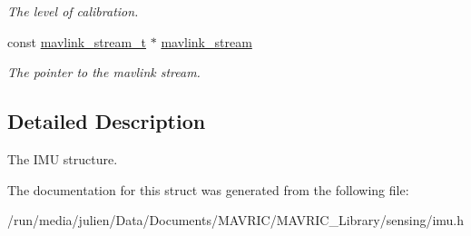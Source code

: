 \begin{DoxyCompactItemize}
\begin{DoxyCompactList}\small\item\em The level of calibration. \end{DoxyCompactList}\item 
\hypertarget{structimu__t_a0c14a88fadf6b52447e988215c1275a2}{const \hyperlink{structmavlink__stream__t}{mavlink\+\_\+stream\+\_\+t} $\ast$ \hyperlink{structimu__t_a0c14a88fadf6b52447e988215c1275a2}{mavlink\+\_\+stream}}\label{structimu__t_a0c14a88fadf6b52447e988215c1275a2}

\begin{DoxyCompactList}\small\item\em The pointer to the mavlink stream. \end{DoxyCompactList}\end{DoxyCompactItemize}


\subsection{Detailed Description}
The I\+M\+U structure. 

The documentation for this struct was generated from the following file\+:\begin{DoxyCompactItemize}
\item 
/run/media/julien/\+Data/\+Documents/\+M\+A\+V\+R\+I\+C/\+M\+A\+V\+R\+I\+C\+\_\+\+Library/sensing/imu.\+h\end{DoxyCompactItemize}
